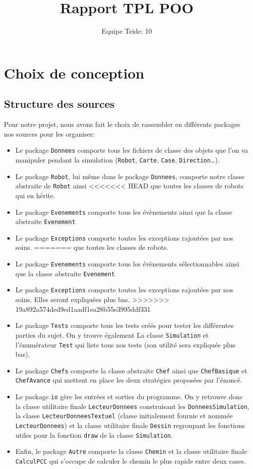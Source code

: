 \documentclass[a4paper,8pt]{article} %
\title{Rapport TPL POO}
\author{Equipe Teide: 10}
\date{} %
\begin{document}
\maketitle
\section{Choix de conception}
\subsection{Structure des sources} %
Pour notre projet, nous avons fait le choix de rassembler en différents packages nos sources pour les organiser: 
\begin{itemize}
    \item Le package \texttt{Donnees} comporte tous les fichiers de classe des objets que l'on va manipuler pendant
    la simulation (\texttt{Robot}, \texttt{Carte}, \texttt{Case}, \texttt{Direction}\ldots).
    \item Le package \texttt{Robot}, lui même dans le package \texttt{Donnees}, comporte notre classe abstraite de \texttt{Robot} ainsi
<<<<<<< HEAD
    que toutes les classes de robots qui en hérite.
    \item Le package \texttt{Evenements} comporte tous les évènements ainsi que la classe abstraite \texttt{Evenement}
    \item Le package \texttt{Exceptions} comporte toutes les exceptions rajoutées par nos soins.
=======
    que toutes les classes de robots.
    \item Le package \texttt{Evenements} comporte tous les évènements sélectionnables ainsi que la classe abstraite \texttt{Evenement}
    \item Le package \texttt{Exceptions} comporte toutes les exceptions rajoutées par nos soins. Elles seront expliquées plus bas.
>>>>>>> 19a892a574ded9ed1aadf1ea28b55e3995ddf331
    \item Le package \texttt{Tests} comporte tous les tests créés pour tester les différentes parties du sujet. On y trouve également
    La classe \texttt{Simulation} et l'énumérateur \texttt{Test} qui liste tous nos tests (son utilité sera expliquée plus bas).
    \item Le package \texttt{Chefs} comporte la classe abstraite \texttt{Chef} ainsi que \texttt{ChefBasique} et \texttt{ChefAvance} qui mettent
    en place les deux stratégies proposées par l'énoncé.
    \item Le package \texttt{io} gère les entrées et sorties du programme. 
    On y retrouve donc la classe utilitaire finale \texttt{LecteurDonnees} construisant les \texttt{DonneesSimulation}, la classe \texttt{LecteurDonneesTextuel} (classe initialement fournie et nommée \texttt{LecteurDonnees}) et la classe utilitaire finale \texttt{Dessin} regroupant les fonctions utiles pour la fonction \texttt{draw} de la classe \texttt{Simulation}. 
    \item Enfin, le package \texttt{Autre} comporte la classe \texttt{Chemin} et la classe utilitaire finale \texttt{CalculPCC} qui s'occupe de calculer le chemin le plus rapide entre deux cases.
    

\end{itemize}
\end{document}
